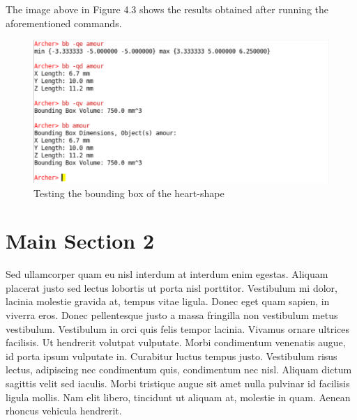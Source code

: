 \hspace{30} The image above in Figure 4.3 shows the results obtained after running the aforementioned commands. 

\begin{figure}[htbp]
\centering
\includegraphics[trim=0.0cm 0.5cm 0.1cm 0.1cm, clip=true, totalheight=0.4\textheight]{Pictures/Bounding.png}
\caption[Testing the bounding box of the heart­-shape]{Testing the bounding box of the heart­-shape}
\label{Bounding}
\end{figure}


\section{Main Section 2}

Sed ullamcorper quam eu nisl interdum at interdum enim egestas. Aliquam placerat justo sed lectus lobortis ut porta nisl porttitor. Vestibulum mi dolor, lacinia molestie gravida at, tempus vitae ligula. Donec eget quam sapien, in viverra eros. Donec pellentesque justo a massa fringilla non vestibulum metus vestibulum. Vestibulum in orci quis felis tempor lacinia. Vivamus ornare ultrices facilisis. Ut hendrerit volutpat vulputate. Morbi condimentum venenatis augue, id porta ipsum vulputate in. Curabitur luctus tempus justo. Vestibulum risus lectus, adipiscing nec condimentum quis, condimentum nec nisl. Aliquam dictum sagittis velit sed iaculis. Morbi tristique augue sit amet nulla pulvinar id facilisis ligula mollis. Nam elit libero, tincidunt ut aliquam at, molestie in quam. Aenean rhoncus vehicula hendrerit.
